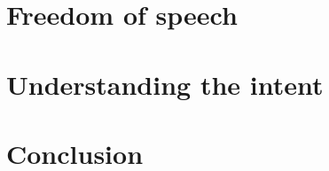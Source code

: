 \documentclass{scrartcl}
\begin{document}
\section{Freedom of speech}



\section{Understanding the intent}



\section{Conclusion}





\end{document}
